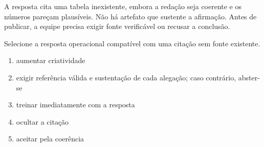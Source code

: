 \documentclass[12pt,a4paper]{article}
\begin{document}

\TextoBase

A resposta cita uma tabela inexistente, embora a redação seja coerente e os números pareçam plausíveis. Não há artefato que sustente a afirmação. Antes de publicar, a equipe precisa exigir fonte verificável ou recusar a conclusão.

\FonteDidatica

\Comando Selecione a resposta operacional compatível com uma citação sem fonte existente.

\begin{enumerate}[label=\Alph*)]
  \item aumentar criatividade
  \item exigir referência válida e sustentação de cada alegação; caso contrário, abster-se
  \item treinar imediatamente com a resposta
  \item ocultar a citação
  \item aceitar pela coerência
\end{enumerate}
\end{document}
